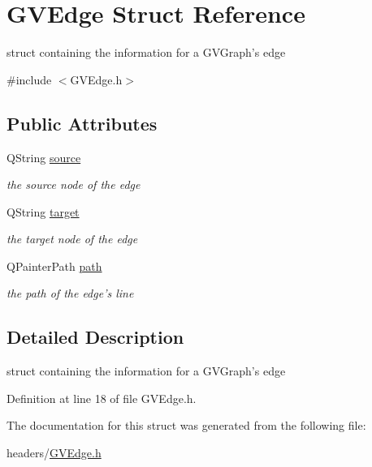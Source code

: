 \hypertarget{structGVEdge}{\section{G\+V\+Edge Struct Reference}
\label{structGVEdge}
}


struct containing the information for a G\+V\+Graph's edge  




{\ttfamily \#include $<$G\+V\+Edge.\+h$>$}

\subsection*{Public Attributes}
\begin{DoxyCompactItemize}
\item 
\hypertarget{structGVEdge_a7a3538b20c3747135ce4771be00a3a8a}{Q\+String \hyperlink{structGVEdge_a7a3538b20c3747135ce4771be00a3a8a}{source}}\label{structGVEdge_a7a3538b20c3747135ce4771be00a3a8a}

\begin{DoxyCompactList}\small\item\em the source node of the edge \end{DoxyCompactList}\item 
\hypertarget{structGVEdge_a6883e0ddce3a6fcbde0b01f3645ae7c5}{Q\+String \hyperlink{structGVEdge_a6883e0ddce3a6fcbde0b01f3645ae7c5}{target}}\label{structGVEdge_a6883e0ddce3a6fcbde0b01f3645ae7c5}

\begin{DoxyCompactList}\small\item\em the target node of the edge \end{DoxyCompactList}\item 
\hypertarget{structGVEdge_ad73f00af1e82b13f9c94982327bc9952}{Q\+Painter\+Path \hyperlink{structGVEdge_ad73f00af1e82b13f9c94982327bc9952}{path}}\label{structGVEdge_ad73f00af1e82b13f9c94982327bc9952}

\begin{DoxyCompactList}\small\item\em the path of the edge's line \end{DoxyCompactList}\end{DoxyCompactItemize}


\subsection{Detailed Description}
struct containing the information for a G\+V\+Graph's edge 

Definition at line 18 of file G\+V\+Edge.\+h.



The documentation for this struct was generated from the following file\+:\begin{DoxyCompactItemize}
\item 
headers/\hyperlink{GVEdge_8h}{G\+V\+Edge.\+h}\end{DoxyCompactItemize}

